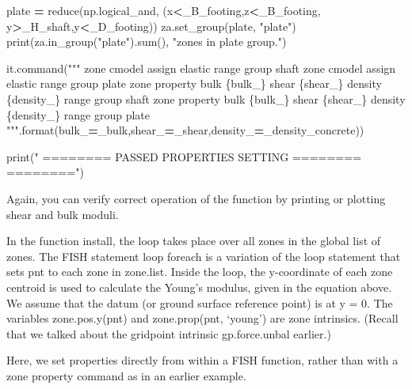 \documentclass[a4paper, nobind]{templates/ociamthesis}
\newenvironment{Shaded}{\begin{snugshade}}{\end{snugshade}}
\newcommand{\BuiltInTok}[1]{#1}
\newcommand{\NormalTok}[1]{#1}
\newcommand{\OperatorTok}[1]{\textcolor[rgb]{0.81,0.36,0.00}{\textbf{#1}}}
\newcommand{\SpecialCharTok}[1]{\textcolor[rgb]{0.00,0.00,0.00}{#1}}
\newcommand{\StringTok}[1]{\textcolor[rgb]{0.31,0.60,0.02}{#1}}
\renewenvironment{Shaded}
{
  \vspace{10pt}%
  \begin{snugshade}%
}{%
  \end{snugshade}%
  \vspace{8pt}%
}
\begin{document}
\begin{Shaded}
\begin{Highlighting}[]
\NormalTok{plate }\OperatorTok{=} \BuiltInTok{reduce}\NormalTok{(np.logical\_and, (x}\OperatorTok{\textless{}}\NormalTok{\_B\_footing,z}\OperatorTok{\textless{}}\NormalTok{\_B\_footing, y}\OperatorTok{\textgreater{}}\NormalTok{\_H\_shaft,y}\OperatorTok{\textless{}}\NormalTok{\_D\_footing))}
\NormalTok{za.set\_group(plate, }\StringTok{"plate"}\NormalTok{)}
\BuiltInTok{print}\NormalTok{(za.in\_group(}\StringTok{"plate"}\NormalTok{).}\BuiltInTok{sum}\NormalTok{(), }\StringTok{"zones in plate group."}\NormalTok{)}

\NormalTok{it.command(}\StringTok{"""}
\StringTok{zone cmodel assign elastic range group \textquotesingle{}shaft\textquotesingle{}}
\StringTok{zone cmodel assign elastic range group \textquotesingle{}plate\textquotesingle{}}
\StringTok{zone property bulk }\SpecialCharTok{\{bulk\_\}}\StringTok{ shear }\SpecialCharTok{\{shear\_\}}\StringTok{ density }\SpecialCharTok{\{density\_\}}\StringTok{ range group \textquotesingle{}shaft\textquotesingle{}}
\StringTok{zone property bulk }\SpecialCharTok{\{bulk\_\}}\StringTok{ shear }\SpecialCharTok{\{shear\_\}}\StringTok{ density }\SpecialCharTok{\{density\_\}}\StringTok{ range group \textquotesingle{}plate\textquotesingle{}}
\StringTok{"""}\NormalTok{.}\BuiltInTok{format}\NormalTok{(bulk\_}\OperatorTok{=}\NormalTok{\_bulk,shear\_}\OperatorTok{=}\NormalTok{\_shear,density\_}\OperatorTok{=}\NormalTok{\_density\_concrete))}

\BuiltInTok{print}\NormalTok{(}\StringTok{"               ======== PASSED PROPERTIES SETTING ========        ========"}\NormalTok{)}
\end{Highlighting}
\end{Shaded}

Again, you can verify correct operation of the function by printing or plotting shear and bulk moduli.

In the function install, the loop takes place over all zones in the
global list of zones. The FISH statement loop foreach is a variation of the loop statement that sets pnt to each zone in zone.list. Inside the loop, the y-coordinate of each zone centroid is used to calculate the Young's modulus, given in the equation above. We assume that the datum (or ground surface reference point) is at y = 0. The variables
zone.pos.y(pnt) and zone.prop(pnt, `young') are zone intrinsics. (Recall that we talked about the gridpoint intrinsic gp.force.unbal earlier.)

Here, we set properties directly from within a FISH function, rather
than with a zone property command as in an earlier example.
\end{document}
